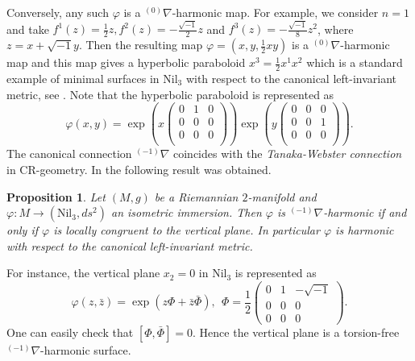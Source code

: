 \documentclass[12pt]{amsart}
\newtheorem{Proposition}[Theorem]{Proposition}
\theoremstyle{definition}
\theoremstyle{remark}
\numberwithin{equation}{section}
\begin{document}
 Conversely, any such $\varphi$ is a ${{}^{(0)}\nabla}$-harmonic map.
 For example, we consider $n=1$ and 
 take $ f^1(z)=\frac{1}{2}z, f^{2}(z)=-\frac{\sqrt{-1}}{2}z$ and 
 $f^{3}(z)=-\frac{\sqrt{-1}}{8}z^2$, where $z = x + \sqrt{-1} y$.
 Then the resulting map
 $\varphi=(x,y,\tfrac{1}{2}xy)$ 
 is a ${{}^{(0)}\nabla}$-harmonic map and this map gives 
 a hyperbolic paraboloid $x^3=\tfrac{1}{2} x^1x^2$ 
 which is a standard example 
 of minimal surfaces in $\mathrm{Nil}_3$ with respect to the 
 canonical left-invariant metric, see \cite{DIK2}.
 Note that the hyperbolic paraboloid is represented as
\begin{equation*}
 \varphi(x, y) = 
\exp \left( x 
 \begin{pmatrix} 
 0 & 1 & 0\\  0 & 0 & 0\\  0 & 0 &0 \\ 
 \end{pmatrix}
\right)
\exp \left(y
 \begin{pmatrix} 
 0 & 0 & 0\\  0 & 0 & 1\\  0 & 0 &0 \\ 
\end{pmatrix}
\right).
\end{equation*}
 The canonical connection ${{}^{(-1)}\nabla}$ coincides with 
 the \textit{Tanaka-Webster connection} in CR-geometry. 
 In \cite{CIL} the following result was obtained.
\begin{Proposition}
 Let $(M,g)$ be a Riemannian $2$-manifold and $\varphi:M\to 
 (\mathrm{Nil}_3,ds^2)$  an isometric immersion. 
 Then $\varphi$ is ${{}^{(-1)}\nabla}$-harmonic if and only if $\varphi$ is 
 locally congruent to the vertical plane. In particular 
 $\varphi$ is harmonic with 
 respect to the canonical left-invariant metric. 
\end{Proposition}

For instance, the vertical plane $x_2=0$ in $\mathrm{Nil}_3$ 
is represented as 
\begin{equation*}
\varphi(z,\bar{z})=\exp(z\varPhi+\bar{z}\bar{\varPhi}),
\ \ 
\varPhi=\frac{1}{2}
\left(
\begin{array}{ccc}
0 & 1 & -\sqrt{-1}\\
0 & 0 & 0\\
0 & 0 & 0
\end{array}
\right).
\end{equation*}
 One can easily check that $[\varPhi,\bar {\varPhi}]=0$.
 Hence the vertical plane is a torsion-free ${{}^{(-1)}\nabla}$-harmonic surface.
\end{document}
